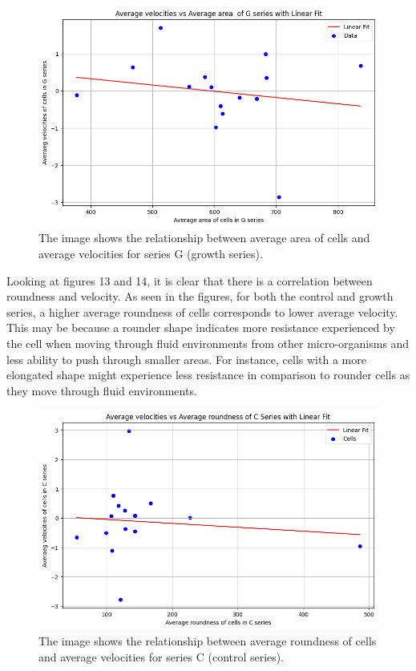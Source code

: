 \documentclass{article}
\begin{document}
\begin{figure}[h!]
\centering
\includegraphics[width=0.75\linewidth]{Report/RImages/Graphs/relationship_g.png}
\caption{\label{fig:Mean_Distance}The image shows the relationship between average area of cells and average velocities for series G (growth series).}
\end{figure}
\clearpage
\newpage

Looking at figures 13 and 14, it is clear that there is a correlation between roundness and velocity. As seen in the figures, for both the control and growth series, a higher average roundness of cells corresponds to lower average velocity. This may be because a rounder shape indicates more resistance experienced by the cell when moving through fluid environments from other micro-organisms and less ability to push through smaller areas. For instance, cells with a more elongated shape might experience less resistance in comparison to rounder cells as they move through fluid environments.


\begin{figure}[h!]
\centering
\includegraphics[width=0.75\linewidth]{Report/RImages/Graphs/relation_c.png}
\caption{\label{fig:Mean_Distance}The image shows the relationship between average roundness of cells and average velocities for series C (control series).}
\end{figure}
\end{document}
